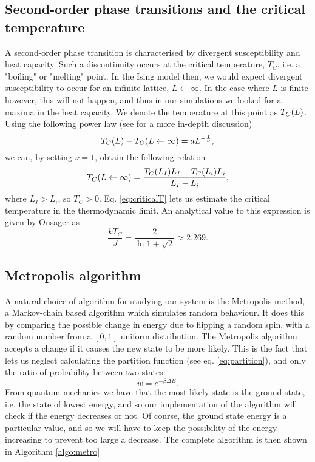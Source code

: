 \subsection{Second-order phase transitions and the critical temperature}
\label{sec:phase}
A second-order phase transition is characterised by divergent susceptibility and heat capacity. Such a discontinuity occurs at the critical temperature, $T_C$, i.e. a "boiling" or "melting" point. In the Ising model then, we would expect divergent susceptibility to occur for an infinite lattice, $L \leftarrow \infty$. In the case where $L$ is finite however, this will not happen, and thus in our simulations we looked for a maxima in the heat capacity. We denote the temperature at this point as $T_C\qty(L)$. Using the following power law (see \cite{statmech} for a more in-depth discussion)
	\begin{equation}
	\label{eq:power}
	T_C\qty(L) - T_C\qty(L \leftarrow \infty) = aL^{-\frac{1}{\nu}},
	\end{equation}
we can, by setting $\nu = 1$, obtain the following relation
	\begin{equation}
	\label{eq:criticalT}
	T_C\qty(L \leftarrow \infty) = \frac{T_C\qty(L_I)L_I - T_C\qty(L_i)L_i}{L_I - L_i},
	\end{equation}
where $L_I > L_i$, so $T_C > 0$. Eq. \ref{eq:criticalT} lets us estimate the critical temperature in the thermodynamic limit. An analytical value to this expression is given by Onsager \cite{onsager} as
	\begin{equation}
	\label{eq:analyticT}
	\frac{kT_C}{J} = \frac{2}{\ln{1 + \sqrt{2}}} \approx 2.269.
	\end{equation}

\subsection{Metropolis algorithm}
\label{sec:metropolis}
A natural choice of algorithm for studying our system is the Metropolis method, a Markov-chain based algorithm which simulates random behaviour. It does this by comparing the possible change in energy due to flipping a random spin, with a random number from a $[0, 1]$ uniform distribution. The Metropolis algorithm accepts a change if it causes the new state to be more likely. This is the fact that lets us neglect calculating the partition function (see eq. \ref{eq:partition}), and only the ratio of probability between two states:
	\begin{equation}
	\label{eq:probratio}
		w = e^{-\beta \Delta E}.
	\end{equation}
From quantum mechanics we have that the most likely state is the ground state, i.e. the state of lowest energy, and so our implementation of the algorithm will check if the energy decreases or not. Of course, the ground state energy is a particular value, and so we will have to keep the possibility of the energy increasing to prevent too large a decrease. The complete algorithm is then shown in Algorithm \ref{algo:metro}
	
